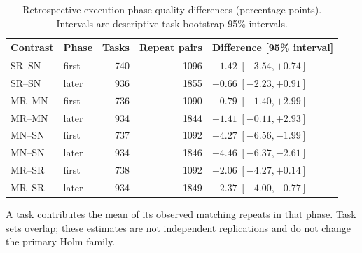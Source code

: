 \begin{table}[t]
\caption{Retrospective execution-phase quality differences (percentage points). Intervals are descriptive task-bootstrap 95\% intervals.}
\label{tab:temporal-diagnostics}
\centering\small
\begin{tabular}{@{}llrrl@{}}\toprule
Contrast & Phase & Tasks & Repeat pairs & Difference [95\% interval]\\
\midrule
SR--SN & first & 740 & 1096 & $-1.42\;[-3.54, +0.74]$\\
SR--SN & later & 936 & 1855 & $-0.66\;[-2.23, +0.91]$\\
MR--MN & first & 736 & 1090 & $+0.79\;[-1.40, +2.99]$\\
MR--MN & later & 934 & 1844 & $+1.41\;[-0.11, +2.93]$\\
MN--SN & first & 737 & 1092 & $-4.27\;[-6.56, -1.99]$\\
MN--SN & later & 934 & 1846 & $-4.46\;[-6.37, -2.61]$\\
MR--SR & first & 738 & 1092 & $-2.06\;[-4.27, +0.14]$\\
MR--SR & later & 934 & 1849 & $-2.37\;[-4.00, -0.77]$\\
\bottomrule\end{tabular}
\par\smallskip\noindent A task contributes the mean of its observed matching repeats in that phase. Task sets overlap; these estimates are not independent replications and do not change the primary Holm family.
\end{table}
